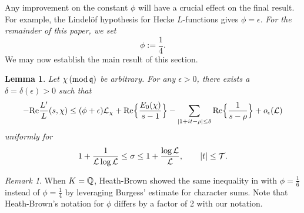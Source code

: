 \documentclass[12pt,psamsfonts]{amsart}
\newtheorem{lem}[thm]{Lemma}
\theoremstyle{definition}
\theoremstyle{remark}
\newtheorem*{rem*}{Remark}
\numberwithin{equation}{section}
\newcounter{notation}
\begin{document}
Any improvement on the constant $\phi$ will have a crucial effect on the final result. For example, the Lindel\"{o}f hypothesis for Hecke $L$-functions gives $\phi = \epsilon$. \emph{For the remainder of this paper, we set }
\[
\phi := \frac{1}{4}. 
\]
We may now establish the main result of this section.
\begin{lem} \label{ClassicalEI} Let $\chi \, (\mathrm{mod} {\, \mathfrak{q}})$ be arbitrary. For any $\epsilon > 0$, there exists a $\delta = \delta(\epsilon) > 0$ such that
\[
-\mathrm{Re} \frac{L'}{L}(s,\chi) \leq ( \phi + \epsilon )\mathcal{L}_{\chi} +  \mathrm{Re}\Big\{ \frac{E_0(\chi)}{s-1}  \Big\} - \sum_{|1+it-\rho| \leq \delta} \mathrm{Re}\Big\{ \frac{1}{s-\rho} \Big\}  + o_{\epsilon}(\mathcal{L})
\]
uniformly for
\[
1 + \frac{1}{\mathcal{L} \log \mathcal{L}} \leq \sigma \leq 1 + \frac{\log\mathcal{L}}{\mathcal{L}}, \qquad |t| \leq \mathcal{T}.
\]
\end{lem}
\begin{rem*} When $K=\mathbb{Q}$,  Heath-Brown showed the same inequality in \cite[Lemma 3.1]{HBLinnik} with $\phi = \tfrac{1}{6}$ instead of $\phi = \tfrac{1}{4}$ by leveraging Burgess' estimate for character sums. Note that Heath-Brown's notation for $\phi$ differs by a factor of 2 with our notation. 
\end{rem*}
\end{document}
